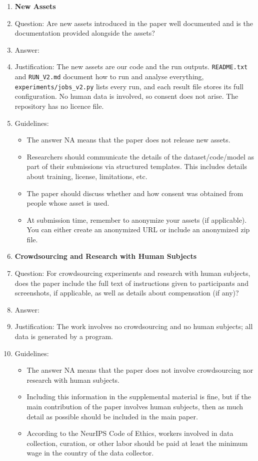 \begin{enumerate}
\item {\bf New Assets}
    \item[] Question: Are new assets introduced in the paper well documented and is the documentation provided alongside the assets?
    \item[] Answer: \answerYes{}
    \item[] Justification: The new assets are our code and the run outputs. \texttt{README.txt} and \texttt{RUN\_V2.md} document how to run and analyse everything, \texttt{experiments/jobs\_v2.py} lists every run, and each result file stores its full configuration. No human data is involved, so consent does not arise. The repository has no licence file.
    \item[] Guidelines:
    \begin{itemize}
        \item The answer NA means that the paper does not release new assets.
        \item Researchers should communicate the details of the dataset/code/model as part of their submissions via structured templates. This includes details about training, license, limitations, etc.
        \item The paper should discuss whether and how consent was obtained from people whose asset is used.
        \item At submission time, remember to anonymize your assets (if applicable). You can either create an anonymized URL or include an anonymized zip file.
    \end{itemize}

\item {\bf Crowdsourcing and Research with Human Subjects}
    \item[] Question: For crowdsourcing experiments and research with human subjects, does the paper include the full text of instructions given to participants and screenshots, if applicable, as well as details about compensation (if any)?
    \item[] Answer: \answerNA{}
    \item[] Justification: The work involves no crowdsourcing and no human subjects; all data is generated by a program.
    \item[] Guidelines:
    \begin{itemize}
        \item The answer NA means that the paper does not involve crowdsourcing nor research with human subjects.
        \item Including this information in the supplemental material is fine, but if the main contribution of the paper involves human subjects, then as much detail as possible should be included in the main paper.
        \item According to the NeurIPS Code of Ethics, workers involved in data collection, curation, or other labor should be paid at least the minimum wage in the country of the data collector.
    \end{itemize}


\end{enumerate}
